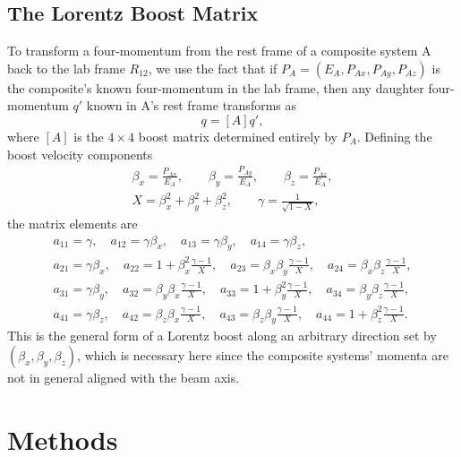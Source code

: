 \documentclass{article}
\begin{document}
\subsection{The Lorentz Boost Matrix}
\label{sssec:lorentz}
To transform a four-momentum from the rest frame of a composite system A back to the lab frame $R_{12}$, we use the fact that if $P_A=(E_A,P_{Ax},P_{Ay},P_{Az})$ is the composite's known four-momentum in the lab frame, then any daughter four-momentum $q'$ known in A's rest frame transforms as
\begin{equation}
    q=[A]q', \label{equa:matrixq}
\end{equation}
where $[A]$ is the $4\times4$ boost matrix determined entirely by $P_A$. Defining the boost velocity components
\begin{equation}
\begin{gathered}
    \beta_x=\frac{P_{Ax}}{E_A}, \qquad \beta_y=\frac{P_{Ay}}{E_A}, \qquad \beta_z=\frac{P_{Az}}{E_A}, \\ X=\beta^2_x+\beta^2_y+\beta^2_z, \qquad \gamma=\frac{1}{\sqrt{1-X}},
\end{gathered}
\end{equation}
the matrix elements are
\begin{equation}
\begin{gathered}
    a_{11}=\gamma, \quad a_{12}=\gamma\beta_x, \quad a_{13}=\gamma\beta_y, \quad a_{14}=\gamma\beta_z,\\
    a_{21}=\gamma\beta_x, \quad a_{22}=1+\beta^2_x\frac{\gamma-1}{X}, \quad a_{23}=\beta_x\beta_y\frac{\gamma-1}{X}, \quad a_{24}=\beta_x\beta_z\frac{\gamma-1}{X}, \\
    a_{31}=\gamma\beta_y, \quad a_{32}=\beta_y\beta_x\frac{\gamma-1}{X}, \quad a_{33}=1+\beta^2_y\frac{\gamma-1}{X}, \quad a_{34}=\beta_y\beta_z\frac{\gamma-1}{X}, \\
    a_{41}=\gamma\beta_z, \quad a_{42}=\beta_z\beta_x\frac{\gamma-1}{X}, \quad a_{43}=\beta_z\beta_y\frac{\gamma-1}{X}, \quad a_{44}=1+\beta^2_z\frac{\gamma-1}{X}.
\end{gathered}
\end{equation}
This is the general form of a Lorentz boost along an arbitrary direction set by $(\beta_x,\beta_y,\beta_z)$, which is necessary here since the composite systems' momenta are not in general aligned with the beam axis.

\section{Methods}
\label{sec:methods}
\end{document}
